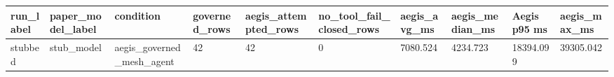 \begin{tabular}{llllllllll}
 \hline
run\_label & paper\_model\_label & condition & governed\_rows & aegis\_attempted\_rows & no\_tool\_fail\_closed\_rows & aegis\_avg\_ms & aegis\_median\_ms & Aegis p95 ms & aegis\_max\_ms \\
 \hline
stubbed & stub\_model & aegis\_governed\_mesh\_agent & 42 & 42 & 0 & 7080.524 & 4234.723 & 18394.099 & 39305.042 \\
 \hline
\end{tabular}
